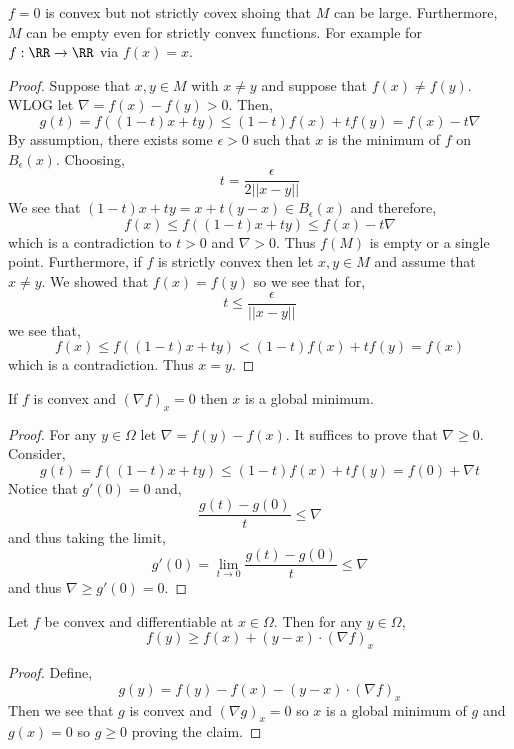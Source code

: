 \documentclass[12pt]{article}
\begin{document}
\begin{rmk}
$f = 0$ is convex but not strictly covex shoing that $M$ can be large. Furthermore, $M$ can be empty even for strictly convex functions. For example for $f : \RR \to \RR$ via $f(x) = x$.
\end{rmk}

\begin{proof}
Suppose that $x, y \in M$ with $x \neq y$ and suppose that $f(x) \neq f(y)$. WLOG let $\nabla = f(x) - f(y) > 0$. Then,
\[ g(t) = f((1-t) x + ty) \le (1-t)f(x) + t f(y) = f(x) - t \nabla \]
By assumption, there exists some $\epsilon > 0$ such that $x$ is the minimum of $f$ on $B_\epsilon(x)$. Choosing,
\[ t = \frac{\epsilon}{2 || x - y||} \]
We see that $(1 - t)x + t y = x + t (y - x) \in B_\epsilon(x)$ and therefore,
\[ f(x) \le f((1-t)x + t y) \le f(x) - t \nabla \]
which is a contradiction to $t > 0$ and $\nabla > 0$. Thus $f(M)$ is empty or a single point. Furthermore, if $f$ is strictly convex then let $x, y \in M$ and assume that $x \neq y$. We showed that $f(x) = f(y)$ so we see that for,
\[ t \le \frac{\epsilon}{||x - y ||} \]
we see that,
\[ f(x) \le f((1 - t)x + t y) < (1 - t) f(x) + t f(y) = f(x) \]
which is a contradiction. Thus $x = y$. 
\end{proof}

\begin{prop}
If $f$ is convex and $(\nabla f)_x = 0$ then $x$ is a global minimum.
\end{prop}

\begin{proof}
For any $y \in \Omega$ let $\nabla = f(y) - f(x)$. It suffices to prove that $\nabla \ge 0$. Consider,
\[ g(t) = f((1-t)x + t y) \le (1 - t) f(x) + t f(y) = f(0) + \nabla t \]
Notice that $g'(0) = 0$ and,
\[ \frac{g(t) - g(0)}{t} \le \nabla \]
and thus taking the limit,
\[ g'(0) = \lim_{t \to 0} \frac{g(t) - g(0)}{t} \le \nabla \]
and thus $\nabla \ge g'(0) = 0$.
\end{proof}

\begin{cor}
Let $f$ be convex and differentiable at $x \in \Omega$. Then for any $y \in \Omega$,
\[ f(y) \ge f(x) + (y - x) \cdot (\nabla f)_x \]
\end{cor}

\begin{proof}
Define,
\[ g(y) = f(y) - f(x) - (y - x) \cdot (\nabla f)_x \]
Then we see that $g$ is convex and $(\nabla g)_x = 0$ so $x$ is a global minimum of $g$ and $g(x) = 0$ so $g \ge 0$ proving the claim.
\end{proof}
\end{document}
